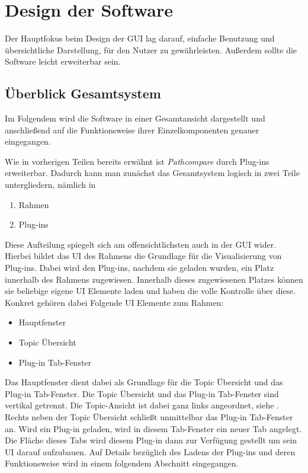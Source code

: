 \section{Design der Software}
Der Hauptfokus beim Design der GUI lag darauf, einfache Benutzung und
übersichtliche Darstellung, für den Nutzer zu gewährleisten.
Außerdem sollte die Software leicht erweiterbar sein.

\subsection{Überblick Gesamtsystem}

Im Folgendem wird die Software in einer Gesamtansicht dargestellt und
anschließend auf die Funktionsweise ihrer Einzelkomponenten genauer eingegangen.

Wie in vorherigen Teilen bereits erwähnt ist \textit{Pathcompare} durch
Plug-ins erweiterbar. Dadurch kann man zunächst das Gesamtsystem logisch in zwei Teile
untergliedern, nämlich in 

\begin{enumerate}
  \item Rahmen
  \item Plug-ins
\end{enumerate}

Diese Aufteilung spiegelt sich am offensichtlichsten auch in der GUI wider.
Hierbei bildet das UI des Rahmens die Grundlage für die Visualisierung von Plug-ins.
Dabei wird den Plug-ins, nachdem sie geladen wurden, ein Platz innerhalb des
Rahmens zugewiesen. Innerhalb dieses zugewiesenen Platzes können sie beliebige
eigene UI Elemente laden und haben die volle Kontrolle über diese. Konkret
gehören dabei Folgende UI Elemente zum Rahmen:

\begin{itemize}
\item Hauptfenster
\item Topic Übersicht
\item Plug-in Tab-Fenster
\end{itemize}

Das Hauptfenster dient dabei als Grundlage für die Topic Übersicht und das
Plug-in Tab-Fenster. Die Topic Übersicht und das Plug-in Tab-Fenster sind vertikal
getrennt. Die Topic-Ansicht ist dabei ganz links angeordnet, siehe   .
Rechts neben der Topic Übersicht schließt unmittelbar das Plug-in
Tab-Fenster an.
Wird ein Plug-in geladen, wird in diesem Tab-Fenster ein neuer Tab angelegt. Die
Fläche dieses Tabs wird diesem Plug-in dann zur Verfügung gestellt um sein UI
darauf aufzubauen. Auf Details bezüglich des Ladens der Plug-ins und deren
Funktionsweise wird in einem folgendem Abschnitt eingegangen. 

